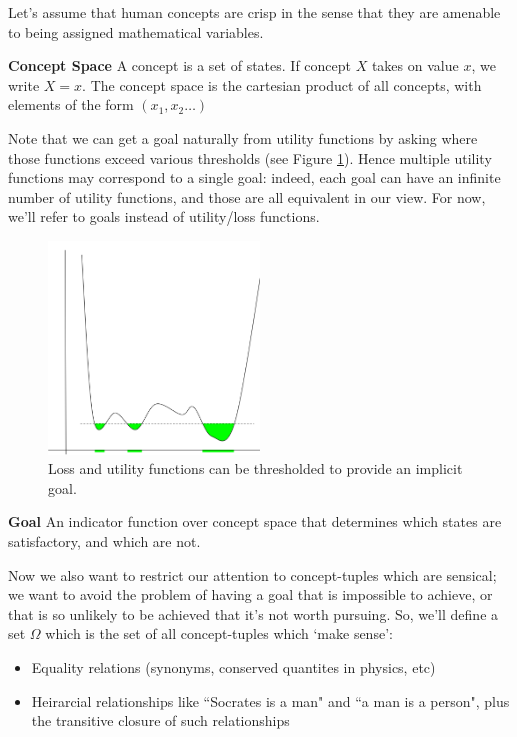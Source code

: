 \documentclass{article}
\begin{document}
Let's assume that human concepts are crisp in the sense that they are amenable to being assigned mathematical variables.

\begin{definition}{\textbf{Concept Space}}
    A concept is a set of states. If concept $X$ takes on value $x$, we write $X=x$.
    The concept space is the cartesian product of all concepts, with elements of the form $(x_1,x_2\dots)$
\end{definition}

Note that we can get a goal naturally from utility functions by asking where those functions exceed various thresholds (see Figure \ref{fig:loss-goal}). Hence multiple utility functions may correspond to a single goal: indeed, each goal can have an infinite number of utility functions, and those are all equivalent in our view. For now, we'll refer to goals instead of utility/loss functions.

\begin{figure}[ht]
    \centering
    \includegraphics[width=0.5\textwidth]{pics/loss-goal.png} 
    \caption{Loss and utility functions can be thresholded to provide an implicit goal.}
    \label{fig:loss-goal} 
\end{figure}

\begin{definition}{\textbf{Goal}}
    An indicator function over concept space that determines which states are satisfactory, and which are not.
\end{definition}


Now we also want to restrict our attention to concept-tuples which are sensical; we want to avoid the problem of having a goal that is impossible to achieve, or that is so unlikely to be achieved that it's not worth pursuing. So, we'll define a set $\Omega$ which is the set of all concept-tuples which `make sense':
\begin{itemize}
    \item Equality relations (synonyms, conserved quantites in physics, etc)
    \item Heirarcial relationships like ``Socrates is a man" and ``a man is a person", plus the transitive closure of such relationships
\end{itemize}
\end{document}

